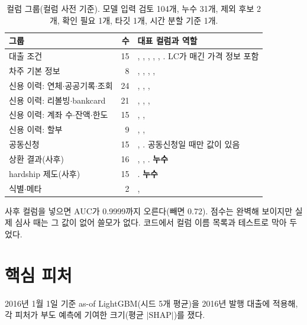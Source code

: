 \begin{table}[H]\centering\small
\begin{tabularx}{\linewidth}{@{}lrL@{}}\toprule
그룹 & 수 & 대표 컬럼과 역할\\\midrule
대출 조건 & 15 & , , , , , . LC가 매긴 가격 정보 포함\\
차주 기본 정보 & 8 & , , , , \\
신용 이력: 연체\ensuremath{\cdot}공공기록\ensuremath{\cdot}조회 & 24 & , , , \\
신용 이력: 리볼빙\ensuremath{\cdot}bankcard & 21 & , , , \\
신용 이력: 계좌 수\ensuremath{\cdot}잔액\ensuremath{\cdot}한도 & 15 & , , \\
신용 이력: 할부 & 9 & , , \\
공동신청 & 15 & , . 공동신청일 때만 값이 있음\\
상환 결과(사후) & 16 & , , . \textbf{누수}\\
hardship 제도(사후) & 15 & . \textbf{누수}\\
식별\ensuremath{\cdot}메타 & 2 & , \\\bottomrule
\end{tabularx}
\caption{컬럼 그룹(컬럼 사전 기준). 모델 입력 검토 104개, 누수 31개, 제외 후보 2개, 확인 필요 1개, 타깃 1개, 시간 분할 기준 1개.}
\end{table}

\begin{warnbox}[누수]
사후 컬럼을 넣으면 AUC가 0.9999까지 오른다(빼면 0.72). 점수는 완벽해 보이지만 실제 심사 때는 그 값이 없어 쓸모가 없다. 코드에서 컬럼 이름 목록과 테스트로 막아 두었다.
\end{warnbox}

\section{핵심 피처}
2016년 1월 1일 기준 as-of LightGBM(시드 5개 평균)을 2016년 발행 대출에 적용해, 각 피처가 부도 예측에 기여한 크기(평균 $|\mathrm{SHAP}|$)를 쟀다.

